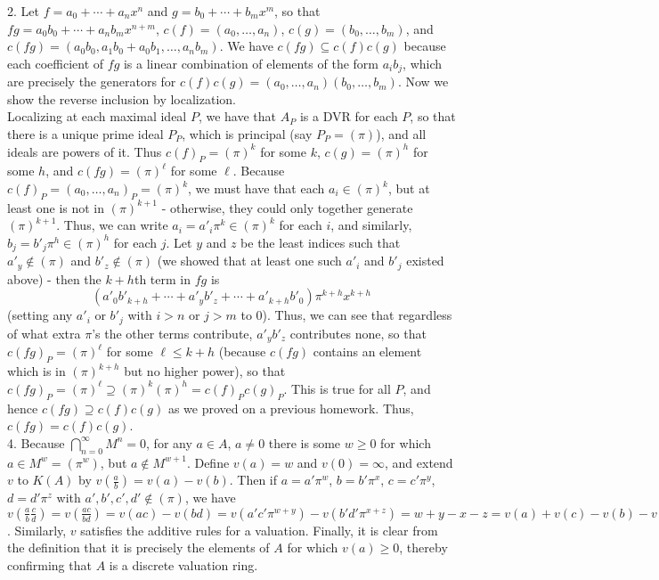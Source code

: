 \documentclass[11pt]{article}
\begin{document}
\num{2.} Let $f=a_0+\cdots+a_nx^n$ and $g=b_0+\cdots+b_mx^m$, so that $fg=a_0b_0+\cdots+a_nb_mx^{n+m}$, $c(f)=(a_0,\ldots,a_n)$, $c(g)=(b_0,\ldots,b_m)$, and $c(fg)=(a_0b_0,a_1b_0+a_0b_1,\ldots,a_nb_m)$. We have $c(fg)\subseteq c(f)c(g)$ because each coefficient of $fg$ is a linear combination of elements of the form $a_ib_j$, which are precisely the generators for $c(f)c(g)=(a_0,\ldots,a_n)(b_0,\ldots,b_m)$. Now we show the reverse inclusion by localization. \\

Localizing at each maximal ideal $P$, we have that $A_P$ is a DVR for each $P$, so that there is a unique prime ideal $P_P$, which is principal (say $P_P=(\pi)$), and all ideals are powers of it. Thus $c(f)_P=(\pi)^k$ for some $k$, $c(g)=(\pi)^h$ for some $h$, and $c(fg)=(\pi)^\ell$ for some $\ell$. Because $c(f)_P=(a_0,\ldots,a_n)_P=(\pi)^k$, we must have that each $a_i\in (\pi)^k$, but at least one is not in $(\pi)^{k+1}$ - otherwise, they could only together generate $(\pi)^{k+1}$. Thus, we can write $a_i=a'_i\pi^k\in(\pi)^k$ for each $i$, and similarly, $b_j=b'_j\pi^h\in(\pi)^h$ for each $j$. Let $y$ and $z$ be the least indices such that $a'_y\notin(\pi)$ and $b'_z\notin (\pi)$ (we showed that at least one such $a'_i$ and $b'_j$ existed above) - then the $k+h$th term in $fg$ is
\[(a'_0b'_{k+h}+\cdots+a'_yb'_z+\cdots+a'_{k+h}b'_0)\pi^{k+h}x^{k+h}\]
(setting any $a'_i$ or $b'_j$ with $i>n$ or $j>m$ to 0). Thus, we can see that regardless of what extra $\pi$'s the other terms contribute, $a'_yb'_z$ contributes none, so that $c(fg)_P=(\pi)^\ell$ for some $\ell\leq k+h$ (because $c(fg)$ contains an element which is in $(\pi)^{k+h}$ but no higher power), so that $c(fg)_P=(\pi)^\ell\supseteq(\pi)^k(\pi)^h=c(f)_Pc(g)_P$. This is true for all $P$, and hence $c(fg)\supseteq c(f)c(g)$ as we proved on a previous homework. Thus, $c(fg)=c(f)c(g)$.\\

\num{4.} Because $\bigcap_{n=0}^\infty M^n=0$, for any $a\in A$, $a\neq0$ there is some $w\geq0$ for which $a\in M^w=(\pi^w)$, but $a\notin M^{w+1}$. Define $v(a)=w$ and $v(0)=\infty$, and extend $v$ to $K(A)$ by $v(\frac{a}{b})=v(a)-v(b)$. Then if $a=a'\pi^w$, $b=b'\pi^x$, $c=c'\pi^y$, $d=d'\pi^z$ with $a',b',c',d'\notin(\pi)$, we have $v(\frac{a}{b}\frac{c}{d})=v(\frac{ac}{bd})=v(ac)-v(bd)=v(a'c'\pi^{w+y})-v(b'd'\pi^{x+z})=w+y-x-z=v(a)+v(c)-v(b)-v(d)=v(a)-v(b)+v(c)-v(d)=v(\frac{a}{b})v(\frac{c}{d})$.  Similarly, $v$ satisfies the additive rules for a valuation. Finally, it is clear from the definition that it is precisely the elements of $A$ for which $v(a)\geq0$, thereby confirming that $A$ is a discrete valuation ring.\\
\end{document}
